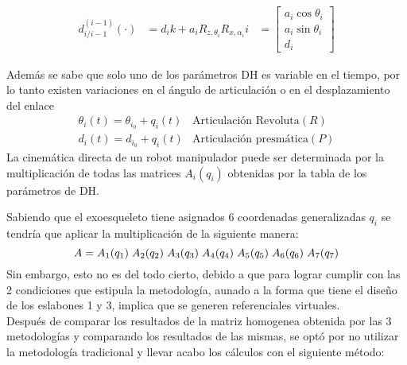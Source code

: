 \documentclass[journal]{IEEEtran}
\begin{document}
    \vspace{2mm}
    \begin{equation*}
    \begin{array}{ccc}
        d_{i/i-1}^{(i-1)} (\cdot) & = d_i k + a_i R_{z,\theta_i} R_{x,\alpha_i}  i 
        & = \left[  \begin{array}{c}
            a_i \cos{\theta_i} \\
            a_i \sin{\theta_i} \\
            d_i 
        \end{array} \right]
    \end{array}
    \end{equation*}

    \vspace{5mm}
    \noindent Además se sabe que solo uno de los parámetros DH es variable en el tiempo, por lo tanto existen
    variaciones en el ángulo de articulación o en el desplazamiento del enlace\\
    \vspace{-2mm}
    \begin{equation*}
        \begin{array}{cc}
            \theta_i (t) = \theta_{i_0} + q_i (t) & \text{Articulación Revoluta} (R) \\
            d_i (t) = d_{i_0} + q_i (t) & \text{Articulación presmática} (P)
        \end{array}
    \end{equation*}
    \vspace{1mm}
    \noindent La cinemática directa de un robot manipulador puede ser determinada por la multiplicación de todas
    las matrices $A_i (q_i)$ obtenidas por la tabla de los parámetros de DH. 

    \noindent Sabiendo que el exoesqueleto tiene asignados 6 coordenadas generalizadas $q_i$ se tendría que
    aplicar la multiplicación de la siguiente manera:
    \begin{equation*}
    A = A_1(q_1) \hspace{1mm} A_2(q_2) \hspace{1mm} A_3(q_3) \hspace{1mm} A_4(q_4) \hspace{1mm} A_5(q_5)
        \hspace{1mm} A_6(q_6) \hspace{1mm} A_7(q_7)
    \end{equation*}
    \noindent Sin embargo, esto no es del todo cierto, debido a que para lograr cumplir con las 2 condiciones que
    estipula la metodología, aunado a la forma que tiene el diseño de los eslabones 1 y 3, implica que se generen
    referenciales virtuales.     \\ 
    \noindent Después de comparar los resultados de la matriz homogenea obtenida por las 3 metodologías y comparando
    los resultados de las mismas, se optó por no utilizar la metodología tradicional y llevar acabo los cálculos con
    el siguiente método: \\ 
\end{document}

